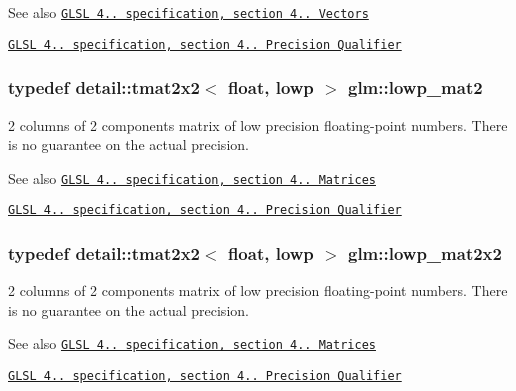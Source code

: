 \begin{DoxySeeAlso}{See also}
\href{http://www.opengl.org/registry/doc/GLSLangSpec.4.20.8.pdf}{\tt G\+L\+SL 4.. specification, section 4.. Vectors} 

\href{http://www.opengl.org/registry/doc/GLSLangSpec.4.20.8.pdf}{\tt G\+L\+SL 4.. specification, section 4.. Precision Qualifier} 
\end{DoxySeeAlso}
\subsubsection[{\texorpdfstring{lowp\+\_\+mat2}{lowp_mat2}}]{\setlength{\rightskip}{0pt plus 5cm}typedef detail\+::tmat2x2$<$ float, lowp $>$ {\bf glm\+::lowp\+\_\+mat2}}\hypertarget{group__core__precision_gac0acc3ccf8da050af3393ea639f698d6}{}\label{group__core__precision_gac0acc3ccf8da050af3393ea639f698d6}
2 columns of 2 components matrix of low precision floating-\/point numbers. There is no guarantee on the actual precision.

\begin{DoxySeeAlso}{See also}
\href{http://www.opengl.org/registry/doc/GLSLangSpec.4.20.8.pdf}{\tt G\+L\+SL 4.. specification, section 4.. Matrices} 

\href{http://www.opengl.org/registry/doc/GLSLangSpec.4.20.8.pdf}{\tt G\+L\+SL 4.. specification, section 4.. Precision Qualifier} 
\end{DoxySeeAlso}
\subsubsection[{\texorpdfstring{lowp\+\_\+mat2x2}{lowp_mat2x2}}]{\setlength{\rightskip}{0pt plus 5cm}typedef detail\+::tmat2x2$<$ float, lowp $>$ {\bf glm\+::lowp\+\_\+mat2x2}}\hypertarget{group__core__precision_ga7d7e123d953978cc17de6882bb10400e}{}\label{group__core__precision_ga7d7e123d953978cc17de6882bb10400e}
2 columns of 2 components matrix of low precision floating-\/point numbers. There is no guarantee on the actual precision.

\begin{DoxySeeAlso}{See also}
\href{http://www.opengl.org/registry/doc/GLSLangSpec.4.20.8.pdf}{\tt G\+L\+SL 4.. specification, section 4.. Matrices} 

\href{http://www.opengl.org/registry/doc/GLSLangSpec.4.20.8.pdf}{\tt G\+L\+SL 4.. specification, section 4.. Precision Qualifier} 
\end{DoxySeeAlso}
